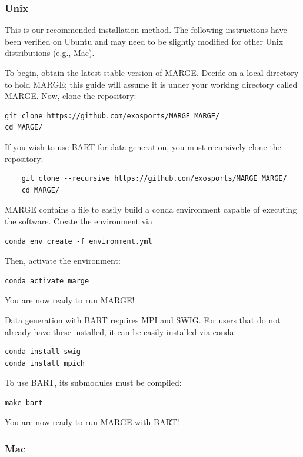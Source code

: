 \documentclass[letterpaper, 12pt]{article}
\begin{document}
\subsubsection{Unix}

\noindent This is our recommended installation method.  The following 
instructions have been verified on Ubuntu and may need to be slightly modified 
for other Unix distributions (e.g., Mac).\newline

\noindent To begin, obtain the latest stable version of MARGE.  Decide on a 
local directory to hold MARGE; this guide will assume it is under your working 
directory called MARGE.  Now, clone the repository:
\begin{verbatim}
git clone https://github.com/exosports/MARGE MARGE/
cd MARGE/
\end{verbatim}

\noindent If you wish to use BART for data generation, you must recursively clone the 
repository:
\begin{verbatim}
	git clone --recursive https://github.com/exosports/MARGE MARGE/
	cd MARGE/
\end{verbatim}

\noindent MARGE contains a file to easily build a conda environment capable of 
executing the software.  Create the environment via
\begin{verbatim}
conda env create -f environment.yml
\end{verbatim}

\noindent Then, activate the environment:
\begin{verbatim}
conda activate marge
\end{verbatim}

\noindent You are now ready to run MARGE!\newline

\noindent Data generation with BART requires MPI and SWIG.  For users that do not 
already have these installed, it can be easily installed via conda:
\begin{verbatim}
conda install swig
conda install mpich
\end{verbatim}

\noindent To use BART, its submodules must be compiled:
\begin{verbatim}
make bart
\end{verbatim}

\noindent You are now ready to run MARGE with BART!


\subsubsection{Mac}
\end{document}
